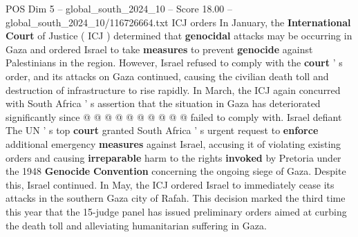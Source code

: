 \begin{textsample}{POS Dim 5 – global\_south\_2024\_10 – Score 18.00 – global\_south\_2024\_10/116726664.txt}
ICJ orders In January, the \textbf{International} \textbf{Court} of Justice ( ICJ ) determined that \textbf{genocidal} attacks may be occurring in Gaza and ordered Israel to take \textbf{measures} to prevent \textbf{genocide} against Palestinians in the region.
However, Israel refused to comply with the \textbf{court} ' s order, and its attacks on Gaza continued, causing the civilian death toll and destruction of infrastructure to rise rapidly.
In March, the ICJ again concurred with South Africa ' s assertion that the situation in Gaza has deteriorated significantly since @ @ @ @ @ @ @ @ @ @ failed to comply with.
Israel defiant The UN ' s top \textbf{court} granted South Africa ' s urgent request to \textbf{enforce} additional emergency \textbf{measures} against Israel, accusing it of violating existing orders and causing \textbf{irreparable} harm to the rights \textbf{invoked} by Pretoria under the 1948 \textbf{Genocide} \textbf{Convention} concerning the ongoing siege of Gaza.
Despite this, Israel continued.
In May, the ICJ ordered Israel to immediately cease its attacks in the southern Gaza city of Rafah.
This decision marked the third time this year that the 15-judge panel has issued preliminary orders aimed at curbing the death toll and alleviating humanitarian suffering in Gaza.

\end{textsample}
